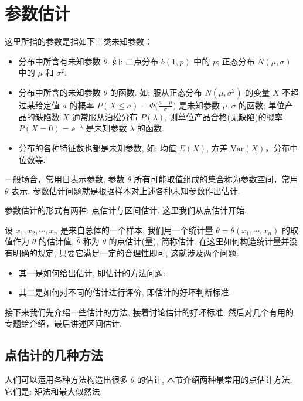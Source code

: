 \setcounter{chapter}{5}

\chapter{参数估计\label{cha:6}} %

这里所指的参数是指如下三类未知参数：
\begin{itemize}
\item 分布中所含有未知参数 $\theta$. 如: 二点分布 $b(1,p)$ 中的 $p$; 正态分布 $N(\mu,\sigma)$ 中的 $\mu$ 和 $\sigma^2$.
\item 分布中所含的未知参数 $\theta$ 的函数. 如: 服从正态分布 $N(\mu,\sigma^2)$ 的变量 $X$ 不超过某给定值 $a$ 的概率 $P(X\leqslant a)=\Phi\big(\frac{a-\mu}{\sigma}\big)$ 是未知参数 $\mu,\sigma$ 的函数; 单位产品的缺陷数 $X$ 通常服从泊松分布 $P(\lambda)$, 则单位产品合格(无缺陷)的概率 $P(X=0)=\ee^{-\lambda}$ 是未知参数 $\lambda$ 的函数.
\item 分布的各种特征数也都是未知参数, 如: 均值 $E(X)$, 方差 $\mathrm{Var}(X)$，分布中位数等.
\end{itemize}

一般场合，常用日表示参数, 参数 $\theta$ 所有可能取值组成的集合称为参数空间，常用 $\theta$ 表示. 参数估计问题就是根据样本对上述各种未知参数作出估计.

参数估计的形式有两种: 点估计与区间估计. 这里我们从点估计开始.

设 $x_1,x_2,\cdots,x_n$ 是来自总体的一个样本, 我们用一个统计量 $\bar{\theta}=\bar{\theta}(x_1,\cdots,x_n)$ 的取值作为 $\theta$ 的估计值, $\bar{\theta}$ 称为 $\theta$ 的点估计(量), 简称估计. 在这里如何构造统计量并没有明确的规定, 只要它满足一定的合理性即可, 这就涉及两个问题:

\begin{itemize}
\item 其一是如何给出估计, 即估计的方法问题:
\item 其二是如何对不同的估计进行评价, 即估计的好坏判断标准.
\end{itemize}

接下来我们先介绍一些估计的方法, 接着讨论估计的好坏标准, 然后对几个有用的专题给介绍，最后讲述区间估计.

\section{点估计的几种方法\label{section-6-1}} %

人们可以运用各种方法构造出很多 $\theta$ 的估计, 本节介绍两种最常用的点估计方法,它们是: 矩法和最大似然法.

